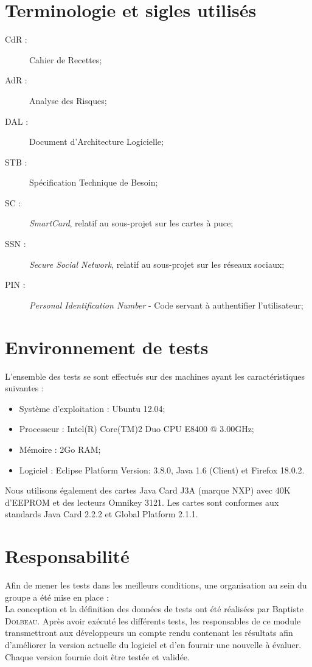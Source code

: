 \documentclass[a4paper,11pt,french]{article}
\begin{document}
\section{Terminologie et sigles utilisés}
\begin{description}
    \item[CdR :] Cahier de Recettes;
    \item[AdR :] Analyse des Risques;
    \item[DAL :] Document d'Architecture Logicielle;
    \item[STB :] Spécification Technique de Besoin;
    \item[SC :] \emph{SmartCard}, relatif au sous-projet sur les cartes à puce;
    \item[SSN :] \emph{Secure Social Network}, relatif au sous-projet sur les
	réseaux sociaux;
    \item[PIN :] \emph{Personal Identification Number} - Code servant à
	authentifier l'utilisateur;
\end{description}

\section{Environnement de tests}
L'ensemble des tests se sont effectués sur des machines ayant les
caractéristiques suivantes :
\begin{itemize} 
	\item Système d'exploitation : Ubuntu 12.04;
	\item Processeur : Intel(R) Core(TM)2 Duo CPU E8400  @ 3.00GHz;
	\item Mémoire : 2Go RAM;
	\item Logiciel : Eclipse Platform Version: 3.8.0, Java 1.6 (Client) et
Firefox 18.0.2.
\end{itemize}


Nous utilisons également des cartes Java Card J3A (marque NXP) avec 40K
d'EEPROM et des lecteurs Omnikey 3121. Les cartes sont conformes aux standards
Java Card 2.2.2 et Global Platform 2.1.1.

\section{Responsabilité}
Afin de mener les tests dans les meilleurs conditions, une organisation au sein
du groupe a été mise en place :\\

La conception et la définition des données de tests ont été réalisées par
Baptiste \textsc{Dolbeau}. Après avoir exécuté les différents tests, les
responsables de ce module transmettront aux développeurs un compte rendu
contenant les résultats afin d’améliorer la version actuelle du logiciel
et d'en fournir une nouvelle à évaluer. Chaque version fournie doit être
testée et validée.
\end{document}
